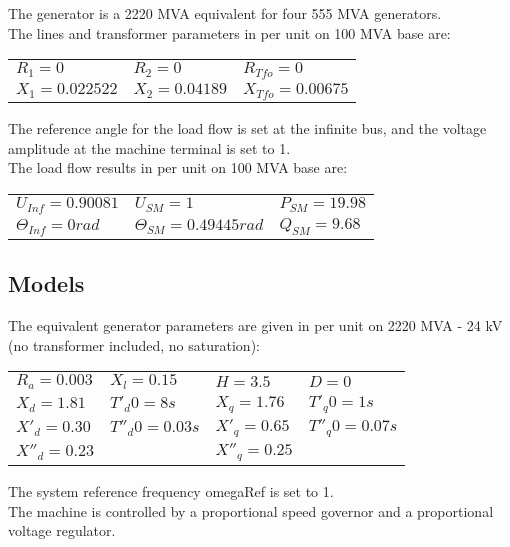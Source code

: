 \documentclass[a4paper, 12pt]{report}
\begin{document}
The generator is a 2220 MVA equivalent for four 555 MVA generators.\\

The lines and transformer parameters in per unit on 100 MVA base are:
\begin{center}
\begin{tabular}{l|l|l}
   $R_1=0$ & $R_2=0$ & $R_{Tfo}=0$ \\
   $X_1=0.022522$ & $X_2=0.04189$ & $X_{Tfo}=0.00675$ \\
\end{tabular}
\end{center}

The reference angle for the load flow is set at the infinite bus, and the voltage amplitude at the machine terminal is set to 1. \\

The load flow results in per unit on 100 MVA base are:
\begin{center}
\begin{tabular}{l|l|l}
   $U_{Inf}=0.90081$ & $U_{SM}=1$ & $P_{SM}=19.98$ \\
   $\Theta_{Inf}=0rad$ & $\Theta_{SM}=0.49445rad$ & $Q_{SM}=9.68$ \\
\end{tabular}
\end{center}

\subsection{Models}

The equivalent generator parameters are given in per unit on 2220 MVA - 24 kV (no transformer included, no saturation):
\begin{center}
\begin{tabular}{l|l|l|l}
   $R_a=0.003$ & $X_l=0.15$ & $H=3.5$ & $D=0$ \\
   $X_d=1.81$ & $T'_d0=8s$ & $X_q=1.76$ & $T'_q0=1s$ \\
   $X'_d=0.30$ & $T''_d0=0.03s$ & $X'_q=0.65$ & $T''_q0=0.07s$ \\
   $X''_d=0.23$ & & $X''_q=0.25$ &  \\
\end{tabular}
\end{center}

The system reference frequency omegaRef is set to 1.\\
The machine is controlled by a proportional speed governor and a proportional voltage regulator. \\
\end{document}
